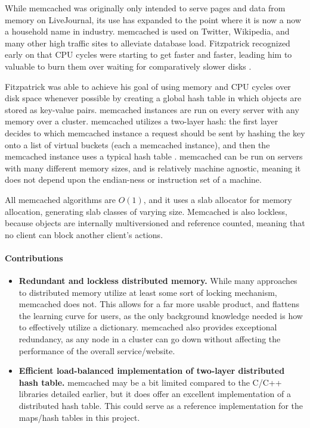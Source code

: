 	While memcached was originally only intended to serve pages and data from memory on LiveJournal, its use has expanded to the point where it is now a now a household name in industry. memcached is used on Twitter, Wikipedia, and many other high traffic sites to alleviate database load. Fitzpatrick recognized early on that CPU cycles were starting to get faster and faster, leading him to valuable to burn them over waiting for comparatively slower disks \cite{memcached_linux}. 

	Fitzpatrick was able to achieve his goal of using memory and CPU cycles over disk space whenever possible by creating a global hash table in which objects are stored as key-value pairs. memcached instances are run on every server with any memory over a cluster.  memcached utilizes a two-layer hash: the first layer decides to which memcached instance a request should be sent by hashing the key onto a list of virtual buckets (each a memcached instance), and then the memcached instance uses a typical hash table \cite{memcached_linux}. memcached can be run on servers with many different memory sizes, and is relatively machine  agnostic, meaning it does not depend upon the endian-ness or instruction set of a machine. 


	All memcached algorithms are $O(1)$, and it uses a slab allocator for memory allocation, generating slab classes of varying size. Memcached is also lockless, because objects are internally multiversioned and reference counted, meaning that no client can block another client's actions.  

	\paragraph{Contributions}
	\begin{itemize}
		\item \textbf{Redundant and lockless distributed memory.} While many approaches to distributed memory utilize at least some sort of locking mechanism, memcached does not. This allows for a far more usable product, and flattens the learning curve for users, as the only background knowledge needed is how to effectively utilize a dictionary. memcached also provides exceptional redundancy, as any node in a cluster can go down without affecting the performance of the overall service/website.  
		\item \textbf{Efficient load-balanced implementation of two-layer distributed hash table.} memcached may be a bit limited compared to the C/C++ libraries detailed earlier, but it does offer an excellent implementation of a distributed hash table. This could serve as a reference implementation for the maps/hash tables in this project. 
	\end{itemize}
